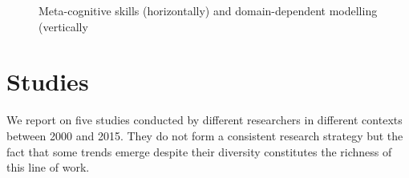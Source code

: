 \documentclass[natbib]{svjour3}
\newcommand{\Model}[3]{{$\mathcal{M}^{\circ}(#1, #2, #3)$}}
\begin{document}
\begin{figure}[htb]
\centering


\caption{\small Meta-cognitive skills (horizontally) and domain-dependent modelling (vertically}

\label{mm_rectangle}
\end{figure}






\section{Studies}

We report on five studies conducted  by different researchers in different contexts
between 2000 and 2015. They do not form a consistent research strategy but
the fact that some trends emerge despite their diversity constitutes the
richness of this line of work.
\end{document}
